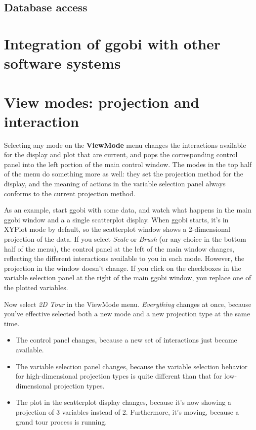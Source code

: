 \documentclass[11pt]{article}
\begin{document}
\subsection {Database access}
\label{slbl:MySQL}

\section{Integration of ggobi with other software systems}
\label{slbl:Integration}

\section{View modes: projection and interaction}
\label{slbl:ViewModes}

Selecting any mode on the {\bf ViewMode} menu changes the interactions
available for the display and plot that are current, and pops the
corresponding control panel into the left portion of the main control
window.  The modes in the top half of the menu do something more as
well:  they set the projection method for the display, and the meaning
of actions in the variable selection panel always conforms to the current
projection method.

As an example, start ggobi with some data, and watch what happens
in the main ggobi window and a a single scatterplot display.   When ggobi
starts, it's in XYPlot mode by default, so the scatterplot window shows
a 2-dimensional projection of the data.  If you select {\em Scale} or
{\em Brush} (or any choice in the bottom half of the menu), the control
panel at the left of the main window changes, reflecting the different
interactions available to you in each mode.  However, the projection in
the window doesn't change.  If you click on the checkboxes in the
variable selection panel at the right of the main ggobi window, you
replace one of the plotted variables.

Now select {\em 2D Tour} in the ViewMode menu.  {\em Everything}
changes at once, because you've effective selected both a new mode and
a new projection type at the same time.
\begin{itemize}
\itemsep 0em
\item The control panel changes, because a new set of interactions
      just became available.
\item The variable selection panel changes, because the variable
      selection behavior for high-dimensional projection types is
      quite different than that for low-dimensional projection types.
\item The plot in the scatterplot display changes, because it's
      now showing a projection of 3 variables instead of 2.  Furthermore,
      it's moving, because a grand tour process is running.
\end{itemize}
\end{document}
